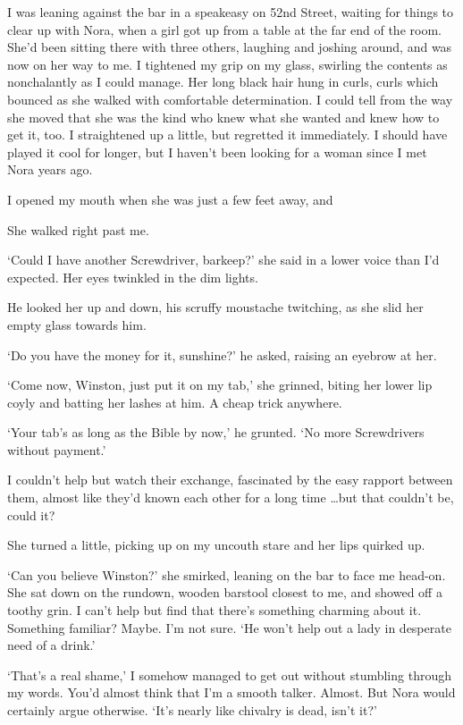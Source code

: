 I was leaning against the bar in a speakeasy on 52nd Street, waiting
for things to clear up with Nora, when a girl got up from a table at
the far end of the room. She'd been sitting there with three others,
laughing and joshing around, and was now on her way to me. I tightened
my grip on my glass, swirling the contents as nonchalantly as I could
manage. Her long black hair hung in curls, curls which bounced as she
walked with comfortable determination. I could tell from the way she
moved that she was the kind who knew what she wanted and knew how to
get it, too. I straightened up a little, but regretted it
immediately. I should have played it cool for longer, but I haven't
been looking for a woman since I met Nora years ago.

I opened my mouth when she was just a few feet away, and \textemdash{}

She walked right past me.

`Could I have another Screwdriver, barkeep?' she said in a lower voice
than I'd expected. Her eyes twinkled in the dim lights.

He looked her up and down, his scruffy moustache twitching, as she
slid her empty glass towards him.

`Do you have the money for it, sunshine?' he asked, raising an eyebrow
at her.

`Come now, Winston, just put it on my tab,' she grinned, biting her
lower lip coyly and batting her lashes at him. A cheap trick anywhere.

`Your tab's as long as the Bible by now,' he grunted. `No more
Screwdrivers without payment.'

I couldn't help but watch their exchange, fascinated by the easy
rapport between them, almost like they'd known each other for a long
time \ldots but that couldn't be, could it?

She turned a little, picking up on my uncouth stare and her lips
quirked up.

`Can you believe Winston?' she smirked, leaning on the bar to face me
head-on. She sat down on the rundown, wooden barstool closest to me,
and showed off a toothy grin. I can't help but find that there's
something charming about it. Something familiar? Maybe. I'm not
sure. `He won't help out a lady in desperate need of a drink.'

`That's a real shame,' I somehow managed to get out without stumbling
through my words. You'd almost think that I'm a smooth
talker. Almost. But Nora would certainly argue otherwise. `It's nearly
like chivalry is dead, isn't it?'

